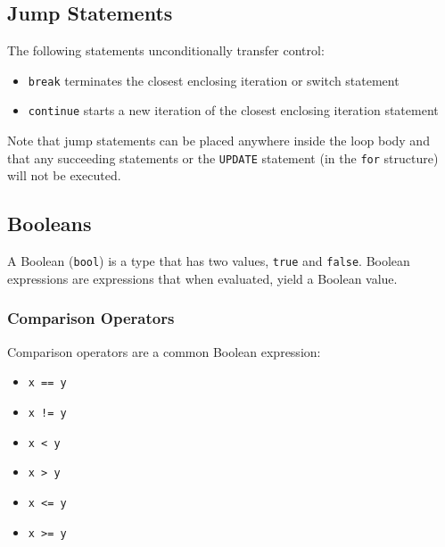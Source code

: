 \documentclass{article}
\begin{document}
\subsection{Jump Statements}
The following statements unconditionally transfer control:
\begin{itemize}
    \item \texttt{break} terminates the closest enclosing iteration or switch statement
    \item \texttt{continue} starts a new iteration of the closest enclosing iteration statement
\end{itemize}
Note that jump statements can be placed anywhere inside the loop body and that any succeeding
statements or the \texttt{UPDATE} statement (in the \texttt{for} structure) %
will not be executed.
\subsection{Booleans}
A Boolean (\texttt{bool}) is a type that has two values,
\texttt{true} and \texttt{false}. Boolean
expressions are expressions that when evaluated, yield a Boolean value.
\subsubsection{Comparison Operators}
Comparison operators are a common Boolean expression:
\begin{itemize}
    \item \texttt{x == y}
    \item \texttt{x != y}
    \item \texttt{x < y}
    \item \texttt{x > y}
    \item \texttt{x <= y}
    \item \texttt{x >= y}
\end{itemize}
\end{document}
